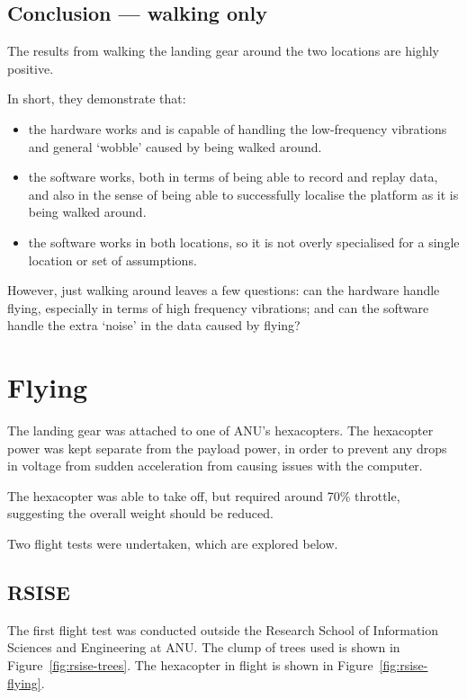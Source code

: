 \documentclass[12pt,oneside,a4paper,draft]{book}
\begin{document}
\subsection{Conclusion --- walking only}
\label{sec:concl-walk-only}

The results from walking the landing gear around the two locations are
highly positive.

In short, they demonstrate that:
\begin{itemize}
\item  the hardware works and is capable of
handling the low-frequency vibrations and general `wobble' caused by
being walked around.
\item the software works, both in terms of being able to record and
  replay data, and also in the sense of being able to successfully
  localise the platform as it is being walked around.
\item the software works in both locations, so it is not overly
  specialised for a single location or set of assumptions.
\end{itemize}

However, just walking around leaves a few questions: can the hardware
handle flying, especially in terms of high frequency vibrations; and
can the software handle the extra `noise' in the data caused by flying?

\section{Flying}
\label{sec:flying}

The landing gear was attached to one of ANU's hexacopters. The
hexacopter power was kept separate from the payload power, in order to
prevent any drops in voltage from sudden acceleration from causing
issues with the computer.

The hexacopter was able to take off, but required around 70\%
throttle, suggesting the overall weight should be reduced.

Two flight tests were undertaken, which are explored below.

\subsection{RSISE}
\label{sec:rsise}

The first flight test was conducted outside the Research School of
Information Sciences and Engineering at ANU. The clump of trees used
is shown in Figure~\ref{fig:rsise-trees}. The hexacopter in flight is
shown in Figure~\ref{fig:rsise-flying}.
\end{document}
